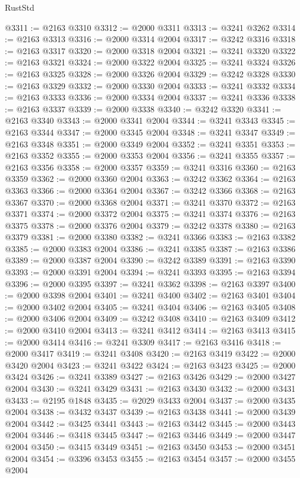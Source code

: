 \begin{lexlean}{RustStd}
\begin{coremodule}
@3311 := @2163 @3310
@3312 := @2000 @3311
@3313 := @3241 @3262
@3314 := @2163 @3313
@3316 := @2000 @3314 @2004
@3317 := @3242 @3316
@3318 := @2163 @3317
@3320 := @2000 @3318 @2004
@3321 := @3241 @3320
@3322 := @2163 @3321
@3324 := @2000 @3322 @2004
@3325 := @3241 @3324
@3326 := @2163 @3325
@3328 := @2000 @3326 @2004
@3329 := @3242 @3328
@3330 := @2163 @3329
@3332 := @2000 @3330 @2004
@3333 := @3241 @3332
@3334 := @2163 @3333
@3336 := @2000 @3334 @2004
@3337 := @3241 @3336
@3338 := @2163 @3337
@3339 := @2000 @3338
@3340 := @3242 @3320
@3341 := @2163 @3340
@3343 := @2000 @3341 @2004
@3344 := @3241 @3343
@3345 := @2163 @3344
@3347 := @2000 @3345 @2004
@3348 := @3241 @3347
@3349 := @2163 @3348
@3351 := @2000 @3349 @2004
@3352 := @3241 @3351
@3353 := @2163 @3352
@3355 := @2000 @3353 @2004
@3356 := @3241 @3355
@3357 := @2163 @3356
@3358 := @2000 @3357
@3359 := @3241 @3316
@3360 := @2163 @3359
@3362 := @2000 @3360 @2004
@3363 := @3242 @3362
@3364 := @2163 @3363
@3366 := @2000 @3364 @2004
@3367 := @3242 @3366
@3368 := @2163 @3367
@3370 := @2000 @3368 @2004
@3371 := @3241 @3370
@3372 := @2163 @3371
@3374 := @2000 @3372 @2004
@3375 := @3241 @3374
@3376 := @2163 @3375
@3378 := @2000 @3376 @2004
@3379 := @3242 @3378
@3380 := @2163 @3379
@3381 := @2000 @3380
@3382 := @3241 @3366
@3383 := @2163 @3382
@3385 := @2000 @3383 @2004
@3386 := @3241 @3385
@3387 := @2163 @3386
@3389 := @2000 @3387 @2004
@3390 := @3242 @3389
@3391 := @2163 @3390
@3393 := @2000 @3391 @2004
@3394 := @3241 @3393
@3395 := @2163 @3394
@3396 := @2000 @3395
@3397 := @3241 @3362
@3398 := @2163 @3397
@3400 := @2000 @3398 @2004
@3401 := @3241 @3400
@3402 := @2163 @3401
@3404 := @2000 @3402 @2004
@3405 := @3241 @3404
@3406 := @2163 @3405
@3408 := @2000 @3406 @2004
@3409 := @3242 @3408
@3410 := @2163 @3409
@3412 := @2000 @3410 @2004
@3413 := @3241 @3412
@3414 := @2163 @3413
@3415 := @2000 @3414
@3416 := @3241 @3309
@3417 := @2163 @3416
@3418 := @2000 @3417
@3419 := @3241 @3408
@3420 := @2163 @3419
@3422 := @2000 @3420 @2004
@3423 := @3241 @3422
@3424 := @2163 @3423
@3425 := @2000 @3424
@3426 := @3241 @3389
@3427 := @2163 @3426
@3429 := @2000 @3427 @2004
@3430 := @3241 @3429
@3431 := @2163 @3430
@3432 := @2000 @3431
@3433 := @2195 @1848
@3435 := @2029 @3433 @2004
@3437 := @2000 @3435 @2004
@3438 := @3432 @3437
@3439 := @2163 @3438
@3441 := @2000 @3439 @2004
@3442 := @3425 @3441
@3443 := @2163 @3442
@3445 := @2000 @3443 @2004
@3446 := @3418 @3445
@3447 := @2163 @3446
@3449 := @2000 @3447 @2004
@3450 := @3415 @3449
@3451 := @2163 @3450
@3453 := @2000 @3451 @2004
@3454 := @3396 @3453
@3455 := @2163 @3454
@3457 := @2000 @3455 @2004

\end{coremodule}
\end{lexlean}
